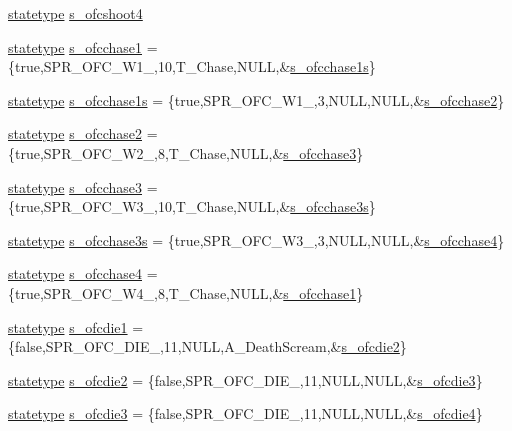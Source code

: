 \begin{DoxyCompactItemize}
\item 
\hyperlink{structstatestruct}{statetype} \hyperlink{WL__ACT2_8C_a2b74b635952f4ea01434ed28815857ee}{s\_\-ofcshoot4}
\item 
\hyperlink{structstatestruct}{statetype} \hyperlink{WL__ACT2_8C_a44b7e077d3373fd8075bb6acdcfcd0df}{s\_\-ofcchase1} = \{true,SPR\_\-OFC\_\-W1\_,10,T\_\-Chase,NULL,\&\hyperlink{WL__ACT2_8C_ae5c4dde8c0f8355a55c9a8bdc9665729}{s\_\-ofcchase1s}\}
\item 
\hyperlink{structstatestruct}{statetype} \hyperlink{WL__ACT2_8C_ae5c4dde8c0f8355a55c9a8bdc9665729}{s\_\-ofcchase1s} = \{true,SPR\_\-OFC\_\-W1\_,3,NULL,NULL,\&\hyperlink{WL__ACT2_8C_a82471cb0d5e2a8a976b5c7e23c3f9b7c}{s\_\-ofcchase2}\}
\item 
\hyperlink{structstatestruct}{statetype} \hyperlink{WL__ACT2_8C_a82471cb0d5e2a8a976b5c7e23c3f9b7c}{s\_\-ofcchase2} = \{true,SPR\_\-OFC\_\-W2\_,8,T\_\-Chase,NULL,\&\hyperlink{WL__ACT2_8C_a24320ed1eb7529458e729fe7520820ba}{s\_\-ofcchase3}\}
\item 
\hyperlink{structstatestruct}{statetype} \hyperlink{WL__ACT2_8C_a24320ed1eb7529458e729fe7520820ba}{s\_\-ofcchase3} = \{true,SPR\_\-OFC\_\-W3\_,10,T\_\-Chase,NULL,\&\hyperlink{WL__ACT2_8C_a4bab1d8d1468401b002c57f4fd40c060}{s\_\-ofcchase3s}\}
\item 
\hyperlink{structstatestruct}{statetype} \hyperlink{WL__ACT2_8C_a4bab1d8d1468401b002c57f4fd40c060}{s\_\-ofcchase3s} = \{true,SPR\_\-OFC\_\-W3\_,3,NULL,NULL,\&\hyperlink{WL__ACT2_8C_aca9896adaab354e9195aa0c8d220c1de}{s\_\-ofcchase4}\}
\item 
\hyperlink{structstatestruct}{statetype} \hyperlink{WL__ACT2_8C_aca9896adaab354e9195aa0c8d220c1de}{s\_\-ofcchase4} = \{true,SPR\_\-OFC\_\-W4\_,8,T\_\-Chase,NULL,\&\hyperlink{WL__DEF_8H_a44b7e077d3373fd8075bb6acdcfcd0df}{s\_\-ofcchase1}\}
\item 
\hyperlink{structstatestruct}{statetype} \hyperlink{WL__ACT2_8C_a745d239bab5bd2f02d5fe4d833075321}{s\_\-ofcdie1} = \{false,SPR\_\-OFC\_\-DIE\_,11,NULL,A\_\-DeathScream,\&\hyperlink{WL__ACT2_8C_ab1681f9594e8d452542bd52de4bba9c1}{s\_\-ofcdie2}\}
\item 
\hyperlink{structstatestruct}{statetype} \hyperlink{WL__ACT2_8C_ab1681f9594e8d452542bd52de4bba9c1}{s\_\-ofcdie2} = \{false,SPR\_\-OFC\_\-DIE\_,11,NULL,NULL,\&\hyperlink{WL__ACT2_8C_a96f032403c7e400bb6aa696b73e8a7bc}{s\_\-ofcdie3}\}
\item 
\hyperlink{structstatestruct}{statetype} \hyperlink{WL__ACT2_8C_a96f032403c7e400bb6aa696b73e8a7bc}{s\_\-ofcdie3} = \{false,SPR\_\-OFC\_\-DIE\_,11,NULL,NULL,\&\hyperlink{WL__ACT2_8C_abf176bf01baaa0866bb02f9c0a3b8da8}{s\_\-ofcdie4}\}

\end{DoxyCompactItemize}
